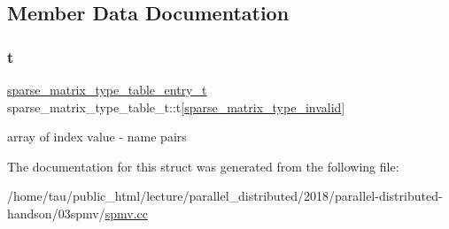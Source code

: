 \subsection{Member Data Documentation}
\mbox{\label{structsparse__matrix__type__table__t_a190c83be8b6111d25205a05ed0b23050}} 
\subsubsection{\texorpdfstring{t}{t}}
{\footnotesize\ttfamily \hyperlink{structsparse__matrix__type__table__entry__t}{sparse\+\_\+matrix\+\_\+type\+\_\+table\+\_\+entry\+\_\+t} sparse\+\_\+matrix\+\_\+type\+\_\+table\+\_\+t\+::t\mbox{[}\hyperlink{spmv_8cc_a43a568fb26bc32aeaad07769cc524c45adbd59ebb0cfb220b9035a64fc2ed28dc}{sparse\+\_\+matrix\+\_\+type\+\_\+invalid}\mbox{]}}

array of index value -\/ name pairs 

The documentation for this struct was generated from the following file\+:\begin{DoxyCompactItemize}
\item 
/home/tau/public\+\_\+html/lecture/parallel\+\_\+distributed/2018/parallel-\/distributed-\/handson/03spmv/\hyperlink{spmv_8cc}{spmv.\+cc}\end{DoxyCompactItemize}

